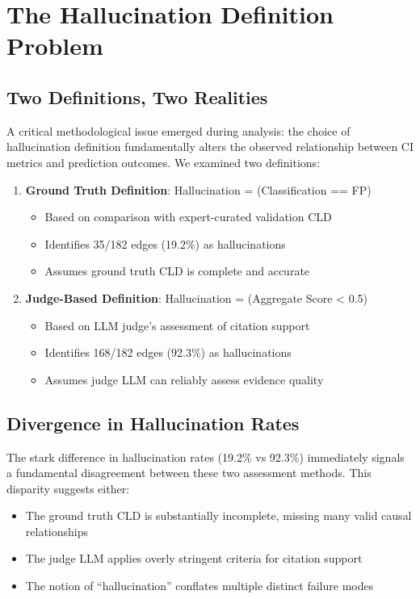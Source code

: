 \section{The Hallucination Definition Problem}

\subsection{Two Definitions, Two Realities}

A critical methodological issue emerged during analysis: the choice of hallucination definition fundamentally alters the observed relationship between CI metrics and prediction outcomes. We examined two definitions:

\begin{enumerate}
    \item \textbf{Ground Truth Definition}: Hallucination = (Classification == FP)
    \begin{itemize}
        \item Based on comparison with expert-curated validation CLD
        \item Identifies 35/182 edges (19.2\%) as hallucinations
        \item Assumes ground truth CLD is complete and accurate
    \end{itemize}
    
    \item \textbf{Judge-Based Definition}: Hallucination = (Aggregate Score < 0.5)
    \begin{itemize}
        \item Based on LLM judge's assessment of citation support
        \item Identifies 168/182 edges (92.3\%) as hallucinations
        \item Assumes judge LLM can reliably assess evidence quality
    \end{itemize}
\end{enumerate}

\subsection{Divergence in Hallucination Rates}

The stark difference in hallucination rates (19.2\% vs 92.3\%) immediately signals a fundamental disagreement between these two assessment methods. This disparity suggests either:

\begin{itemize}
    \item The ground truth CLD is substantially incomplete, missing many valid causal relationships
    \item The judge LLM applies overly stringent criteria for citation support
    \item The notion of ``hallucination'' conflates multiple distinct failure modes
\end{itemize}

